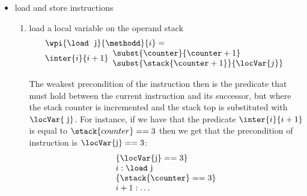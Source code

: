 \begin{itemize}
\begin{enumerate}
\end{enumerate}






\item  load and store instructions
	\begin{enumerate}
		\item load a local variable on the operand stack \\
		 $$ \begin{array}{l}
                          \wpi{\load \  \mbox{ \rm j}}{ \methodd }{i} =  \\
			  \inter{i}{i+1}\begin{array}{l} 
                                              \subst{\counter}{\counter +1} \\
					      \subst{  \stack{ \counter  + 1}}{\locVar{j}} 
					\end{array}
                    \end{array} $$ 
                
                The weakest precondition of the instruction then is the predicate that must hold between the current instruction
                and its successor, but where the stack counter is incremented and the stack top is substituted with $\locVar{\mbox{ \rm j}}$.
                For instance, if we have that the predicate $\inter{i}{i+1} $ is equal to $ \stack{counter} == 3$ then we get that the precondition of
                instruction is $\locVar{\mbox{\rm j}} == 3$:               
		$$
		\begin{array}{l}
		    \{  \locVar{\mbox{\rm j}} == 3 \} \\
		     i:  \load  \ \mbox{\rm j} \\
                     \{ \stack{\counter} == 3 \} \\
                     i+1: \ldots 
		 \end{array}
		$$
 		

\end{enumerate}
\end{itemize}
